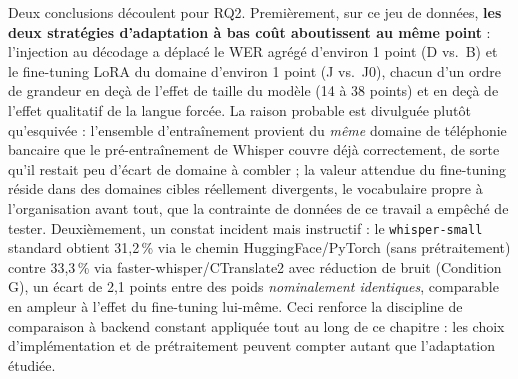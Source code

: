 \documentclass[12pt]{report}
\begin{document}
Deux conclusions découlent pour RQ2. Premièrement, sur ce jeu de données, \textbf{les deux stratégies d'adaptation à bas coût aboutissent au même point} : l'injection au décodage a déplacé le WER agrégé d'environ 1 point (D vs.\ B) et le fine-tuning LoRA du domaine d'environ 1 point (J vs.\ J0), chacun d'un ordre de grandeur en deçà de l'effet de taille du modèle (14 à 38 points) et en deçà de l'effet qualitatif de la langue forcée. La raison probable est divulguée plutôt qu'esquivée : l'ensemble d'entraînement provient du \emph{même} domaine de téléphonie bancaire que le pré-entraînement de Whisper couvre déjà correctement, de sorte qu'il restait peu d'écart de domaine à combler ; la valeur attendue du fine-tuning réside dans des domaines cibles réellement divergents, le vocabulaire propre à l'organisation avant tout, que la contrainte de données de ce travail a empêché de tester. Deuxièmement, un constat incident mais instructif : le \texttt{whisper-small} standard obtient 31,2\,\% via le chemin HuggingFace/PyTorch (sans prétraitement) contre 33,3\,\% via faster-whisper/CTranslate2 avec réduction de bruit (Condition G), un écart de 2,1 points entre des poids \emph{nominalement identiques}, comparable en ampleur à l'effet du fine-tuning lui-même. Ceci renforce la discipline de comparaison à backend constant appliquée tout au long de ce chapitre : les choix d'implémentation et de prétraitement peuvent compter autant que l'adaptation étudiée.
\end{document}
